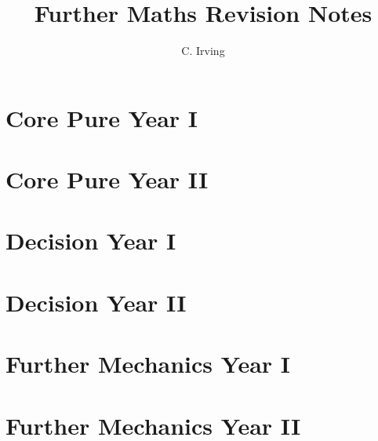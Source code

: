 \documentclass{book}
\title{Further Maths Revision Notes}
\author{C. Irving}
\date{}
\newcommand{\comment}[1]{} %
\begin{document}
\maketitle

\tableofcontents

\mainmatter

\chapter{Core Pure Year I} \label{ch:core_i}
    

\chapter{Core Pure Year II} \label{ch:core_ii}
    

\chapter{Decision Year I} \label{ch:decision_i}
    

\chapter{Decision Year II} \label{ch:decision_ii}
    

\chapter{Further Mechanics Year I} \label{ch:mechanics_i}
    

\chapter{Further Mechanics Year II} \label{ch:mechanics_ii}
    

\comment{ %
\chapter{Further Pure Mathematics Year I} \label{ch:pure_i}
    

\chapter{Further Pure Mathematics Year II} \label{ch:pure_ii}
    
\chapter{Further Statistics Year I} \label{ch:statistics_i}
    

\chapter{Further Statistics Year II} \label{ch:statistics_ii}
    
}
\end{document}
